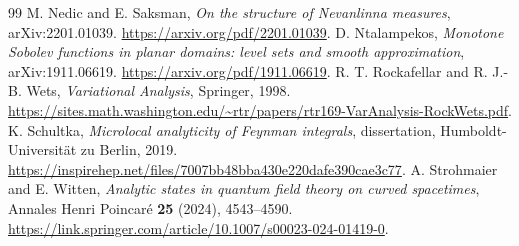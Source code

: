 \documentclass[11pt]{article}
\begin{document}
\begin{thebibliography}{99}
 M. Nedic and E. Saksman, \emph{On the structure of Nevanlinna measures}, arXiv:2201.01039. \url{https://arxiv.org/pdf/2201.01039}.
 D. Ntalampekos, \emph{Monotone Sobolev functions in planar domains: level sets and smooth approximation}, arXiv:1911.06619. \url{https://arxiv.org/pdf/1911.06619}.
 R. T. Rockafellar and R. J.-B. Wets, \emph{Variational Analysis}, Springer, 1998. \url{https://sites.math.washington.edu/~rtr/papers/rtr169-VarAnalysis-RockWets.pdf}.
 K. Schultka, \emph{Microlocal analyticity of Feynman integrals}, dissertation, Humboldt-Universit\"at zu Berlin, 2019. \url{https://inspirehep.net/files/7007bb48bba430e220dafe390cae3c77}.
 A. Strohmaier and E. Witten, \emph{Analytic states in quantum field theory on curved spacetimes}, Annales Henri Poincar\'e \textbf{25} (2024), 4543--4590. \url{https://link.springer.com/article/10.1007/s00023-024-01419-0}.
\end{thebibliography}
\end{document}
